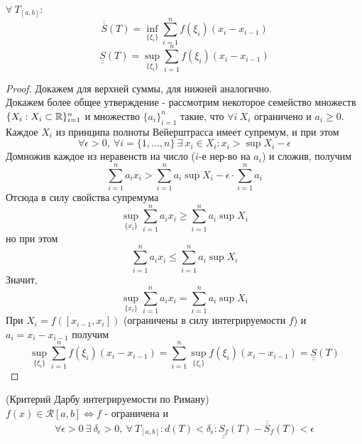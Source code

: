 \begin{numlemma} $\forall\ T_{[a,b]}:$
    \[\overline{\overline{S}}(T)=\inf\limits_{\{\xi_i\}}\sum\limits_{i=1}^{n}f(\xi_i)(x_i-x_{i-1})\]
    \[\underline{\underline{S}}(T)=\sup\limits_{\{\xi_i\}}\sum\limits_{i=1}^{n}f(\xi_i)(x_i-x_{i-1})\]
\end{numlemma} 
\begin{proof}
    Докажем для верхней суммы, для нижней аналогично.\\ Докажем более общее утверждение - рассмотрим некоторое семейство множеств $\{X_i: X_i\subset \mathbb{R}\}_{i=1}^n$ и множество $\{a_i\}_{i=1}^n$ такие, что $\forall i \ X_i$ ограничено и $a_i \geq 0$.\\
    Каждое $X_i$ из принципа полноты Вейерштрасса имеет супремум, и при этом
    \[\forall \epsilon>0,\ \forall i=\{1,\dots,n\}\ \exists\ x_i\in X_i: x_i>\sup X_i-\epsilon\] 
    Домножив каждое из неравенств на число ($i$-е нер-во на $a_i$) и сложив, получим
    \[\sum\limits_{i=1}^{n}a_i x_i>\sum\limits_{i=1}^{n}a_i \sup X_i-\epsilon\cdot \sum\limits_{i=1}^{n}a_i\] 
    Отсюда в силу свойства супремума
    \[\sup\limits_{\{x_i\}} \sum\limits_{i=1}^{n}a_i x_i\geq \sum\limits_{i=1}^{n}a_i \sup X_i\]
    но при этом
    \[\sum\limits_{i=1}^{n}a_i x_i \leq \sum\limits_{i=1}^{n} a_i\sup X_i\]
    Значит,
    \[\sup\limits_{\{x_i\}} \sum\limits_{i=1}^{n}a_i x_i=\sum\limits_{i=1}^{n}a_i \sup X_i\]
    При $X_i = f([x_{i-1}, x_i])$ (ограничены в силу интегрируемости $f$) и $a_i = x_i - x_{i-1}$ получим
    \[\sup\limits_{\{\xi_i\}}\sum\limits_{i=1}^{n}f(\xi_i)(x_i-x_{i-1}) = \sum\limits_{i=1}^{n}\sup\limits_{\{\xi_i\}}f(\xi_i)(x_i-x_{i-1}) = \underline{\underline{S}}(T)\]
\end{proof} 
\begin{theorem} (Критерий Дарбу интегрируемости по Риману)\\
    $f(x)\in \mathcal{R}[a,b] \Leftrightarrow f$ - ограничена и 
    \[\forall \epsilon>0\ \exists\ \delta_{\epsilon}>0,\ \forall\ T_{[a,b]}: d(T)<\delta_{\epsilon}: \underline{\underline{S_f}}(T)-\overline{\overline{S}}_f(T)<\epsilon\]
\end{theorem} 
